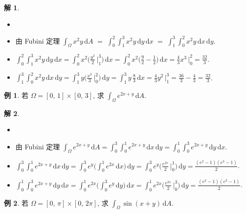 \documentclass[12pt]{extarticle}
\newcommand{\ds}{\displaystyle}
\theoremstyle{definition}
\newtheorem*{ex}{例}
\newtheorem*{sol}{解}
\begin{document}
\begin{sol}
  \begin{itemize}\setlength{\itemsep}{0pt}
    \item[]
    \item 由 Fubini 定理 $\ds\int_\Omega x^2y\,\text{d}A$ $=$ $\ds\int_0^2\!\int_1^3 x^2y\,\text{d}y\,\text{d}x$ $=$ $\ds\int_1^3\!\int_0^2 x^2y\,\text{d}x\,\text{d}y$.
    \item $\ds\int_0^2\!\int_1^3 x^2y\,\text{d}y\,\text{d}x = \int_0^2 x^2\Big(\frac{y^2}{2}\,\Big|_1^3\Big)\,\text{d}x = \int_0^2 x^2\Big(\frac{9}{2} - \frac{1}{2}\Big)\,\text{d}x = \frac{4}{3}x^3\,\Big|_0^2 = \frac{32}{3}$.
    \item $\ds\int_1^3\!\int_0^2 x^2y\,\text{d}x\,\text{d}y = \int_1^3 y\Big(\frac{x^3}{3}\,\Big|_0^2\Big)\,\text{d}y = \int_1^3 y\,\frac{8}{3}\,\text{d}x = \frac{4}{3}y^2\,\Big|_1^3 = \frac{36}{3} - \frac{4}{3} = \frac{32}{3}$.
  \end{itemize}
\end{sol}

\begin{ex}
  若 $\Omega = [0,\,1]\times[0,\,3]$, 求 $\ds\int_\Omega e^{2x + y}\,\text{d}A$.
\end{ex}

\begin{sol}
  \begin{itemize}\setlength{\itemsep}{0pt}
    \item[]
    \item 由 Fubini 定理 $\ds\int_\Omega e^{2x + y}\,\text{d}A = \int_0^3\!\int_0^1 e^{2x + y}\,\text{d}x\,\text{d}y = \int_0^1\!\int_0^3 e^{2x + y}\,\text{d}y\,\text{d}x$.
    \item $\ds\int_0^3\!\int_0^1 e^{2x + y}\,\text{d}x\,\text{d}y = \int_0^3 e^y\bigg(\int_0^1 e^{2x}\,\text{d}x\bigg)\,\text{d}y = \int_0^3 e^y\Big(\frac{e^{2x}}{2}\,\Big|_0^1\Big)\,\text{d}y = \frac{(e^2 - 1)(e^3 - 1)}{2}$.
    \item $\ds\int_0^1\!\int_0^3 e^{2x + y}\,\text{d}y\,\text{d}x = \int_0^1 e^{2x}\bigg(\int_0^3 e^y\,\text{d}y\bigg)\,\text{d}x = \int_0^1 e^{2x}\Big(\frac{e^{2x}}{2}\,\Big|_0^3\Big)\,\text{d}y = \frac{(e^2 - 1)(e^3 - 1)}{2}$.
  \end{itemize}
\end{sol}

\begin{ex}
  若 $\Omega = [0,\,\pi]\times[0,\,2\pi]$, 求 $\ds\int_\Omega\!\sin(x + y)\,\text{d}A$.
\end{ex}
\end{document}
